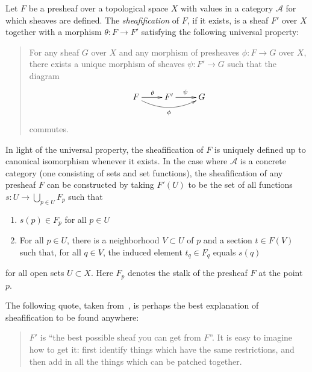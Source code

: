 \documentclass[12pt]{article}
\newcommand{\A}{\mathcal{A}}
\newcommand{\lra}{\longrightarrow}
\begin{document}
Let $F$ be a presheaf over a topological space $X$ with values in a category $\A$ for which sheaves are defined. The {\em sheafification} of $F$, if it exists, is a sheaf $F'$ over $X$ together with a morphism $\theta: F \lra F'$ satisfying the following universal property:

\begin{quotation}
For any sheaf $G$ over $X$ and any morphism of presheaves $\phi: F \lra G$ over $X$, there exists a unique morphism of sheaves $\psi: F' \lra G$ such that the diagram
$$
\xymatrix{
F \ar[r]^{\theta} \ar@/_1pc/[rr]_{\phi} & F' \ar[r]^{\psi} & G
}
$$
commutes.
\end{quotation}
In light of the universal property, the sheafification of $F$ is uniquely defined up to canonical isomorphism whenever it exists. In the case where $\A$ is a concrete category (one consisting of sets and set functions), the sheafification of any presheaf $F$ can be constructed by taking $F'(U)$ to be the set of all functions $s: U \lra \bigcup_{p \in U} F_p$ such that
\begin{enumerate}
\item $s(p) \in F_p$ for all $p \in U$
\item For all $p \in U$, there is a neighborhood $V \subset U$ of $p$ and a section $t \in F(V)$ such that, for all $q \in V$, the induced element $t_q \in F_q$ equals $s(q)$
\end{enumerate}
for all open sets $U \subset X$. Here $F_p$ denotes the stalk of the presheaf $F$ at the point $p$.

The following quote, taken from~\cite{mumford}, is perhaps the best explanation of sheafification to be found anywhere:
\begin{quotation}
$F'$ is ``the best possible sheaf you can get from $F$''. It is easy to imagine how to get it: first identify things which have the same restrictions, and then add in all the things which can be patched together.
\end{quotation}

\begin{thebibliography}{9}
\end{thebibliography}
\end{document}
